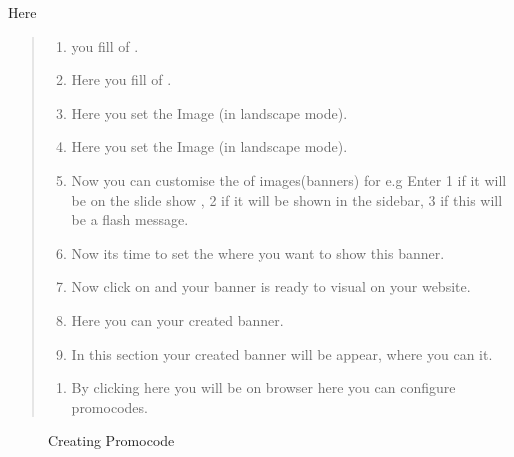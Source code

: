\documentclass[a4paper,10pt,english]{report}
\begin{document}
Here
\begin{quote}
\begin{enumerate}
\def\theenumi{\arabic{enumi}}
\def\labelenumi{\theenumi .}
\makeatletter\def\p@enumii{\p@enumi \theenumi .}\makeatother
\item {} 
you fill  of .

\item {} 
Here you fill  of .

\item {} 
Here you set the  Image (in landscape mode).

\item {} 
Here you set the  Image (in landscape mode).

\item {} 
Now you can customise the  of images(banners) for e.g Enter 1 if it will be on the slide show , 2 if it will be shown in the sidebar, 3 if this will be a flash message.

\item {} 
Now its time to set the  where you want to show this banner.

\item {} 
Now click on  and your banner is ready to visual on your website.

\item {} 
Here you can  your created banner.

\item {} 
In this section your created banner will be appear, where you can  it.

\end{enumerate}
\begin{enumerate}
\def\theenumi{\arabic{enumi}}
\def\labelenumi{\theenumi .}
\makeatletter\def\p@enumii{\p@enumi \theenumi .}\makeatother
\setcounter{enumi}{4}
\item {} 
By clicking here you will be on  browser here you can configure promocodes.

\end{enumerate}
\end{quote}

\begin{figure}[htbp]
\centering
\capstart

\noindent{}
\caption{Creating Promocode}\label{\detokenize{configure:id13}}\label{\detokenize{configure:id5}}\end{figure}
\end{document}
